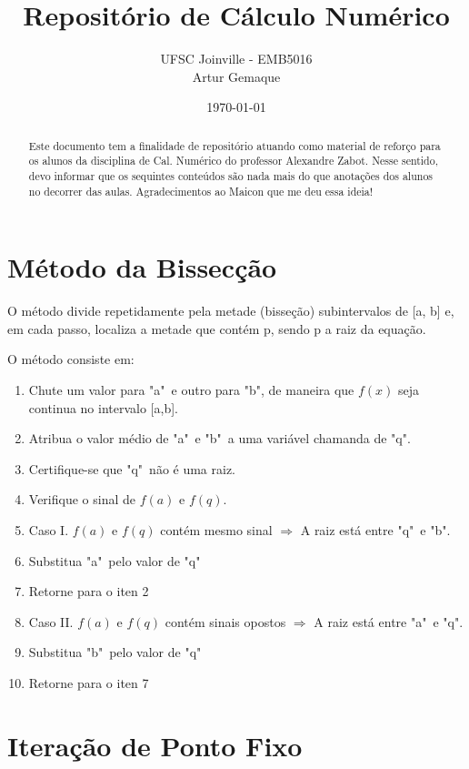 \documentclass{article}
\title{\textbf{Repositório de Cálculo Numérico}}
\author{UFSC Joinville - EMB5016 \\ Artur Gemaque}
\date{\today}
\begin{document}
\maketitle

\begin{abstract}
    Este documento tem a finalidade de repositório atuando como material de reforço 
    para os alunos da disciplina de Cal. Numérico do professor Alexandre Zabot. Nesse sentido, 
    devo informar que os sequintes conteúdos são nada mais do que anotações 
    dos alunos no decorrer das aulas. Agradecimentos ao Maicon que me deu essa ideia!
\end{abstract}

\begin{multicols}{2}
\section{Método da Bissecção}
    O método divide repetidamente pela metade (bisseção) subintervalos de [a, b] e, em cada
    passo, localiza a metade que contém p, sendo p a raiz da equação.

    O método consiste em: 
    \begin{enumerate}
        \item Chute um valor para "a"\ e outro para "b", de maneira que $ f(x) $ seja continua no intervalo [a,b].
        \item Atribua o valor médio de "a"\ e "b"\ a uma variável chamanda de "q".
        \item Certifique-se que "q"\ não é uma raiz.
        \item Verifique o sinal de $ f(a) $ e $ f(q) $.
        \item Caso I. $ f(a) $ e $ f(q) $ contém mesmo sinal $\Longrightarrow $ A raiz está entre "q"\ e "b". 
        \item Substitua "a"\ pelo valor de "q"
        \item Retorne para o iten 2
        \item Caso II. $ f(a) $ e $ f(q) $ contém sinais opostos $\Longrightarrow $ A raiz está entre "a"\ e "q". 
        \item Substitua "b"\ pelo valor de "q"
        \item Retorne para o iten 7
    \end{enumerate}

\section{Iteração de Ponto Fixo}

    

\end{multicols}
\end{document}
